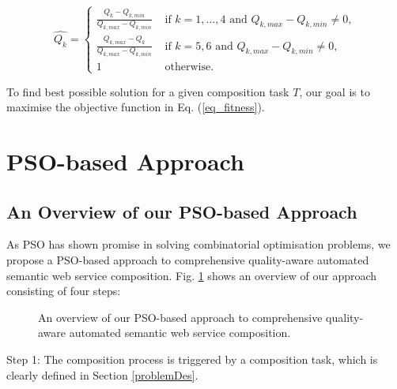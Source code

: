 \begin{equation}
\label{eq_normal}
\hat{Q_k} = 
\begin{cases}
	\frac{Q_k - Q_{k, min}}{Q_{k, max} - Q_{k, min}} & \text{ if $k=1,\ldots,4$ and }Q_{k, max} - Q_{k, min} \neq 0,\\
	\frac{Q_{k,max} - Q_k}{Q_{k, max} - Q_{k, min}} & \text{ if $k=5,6$ and }Q_{k, max} - Q_{k, min} \neq 0,\\
	1 & \text{ otherwise}.
\end{cases}
\end{equation}

\noindent To find best possible solution for a given composition task $T$, our goal is to maximise the objective function in Eq. (\ref{eq_fitness}).


\section{PSO-based Approach}\label{qswsc_approach}
\subsection{An Overview of our PSO-based Approach}\label{PSO_based_approach}
As PSO has shown promise in solving combinatorial optimisation problems, we propose a PSO-based approach to comprehensive quality-aware automated semantic web service composition. Fig. \ref{overview} shows an overview of our approach consisting of four steps: 
\begin{figure}[h]
\centering
{}
 \caption{An overview of our PSO-based approach to comprehensive quality-aware automated semantic web service composition.}
 \label{overview}
\end{figure}

Step 1: The composition process is triggered by a composition task, which is clearly defined in Section \ref{problemDes}. 

